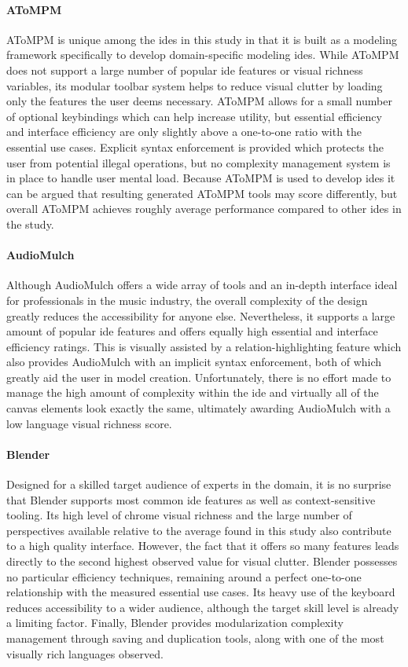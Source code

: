\paragraph{AToMPM} AToMPM is unique among the \acp{ide} in this study in
that it is built as a modeling framework specifically to develop domain-specific modeling \acp{ide}.
While AToMPM does not support a large number of popular \ac{ide} features
or visual richness variables, its modular toolbar system helps to reduce
visual clutter by loading only the features the user deems necessary.
AToMPM allows for a small number of optional keybindings which can help
increase utility, but essential efficiency and interface efficiency are
only slightly above a one-to-one ratio with the essential use cases.
Explicit syntax enforcement is provided which protects the user from
potential illegal operations, but no complexity management system is in
place to handle user mental load. Because AToMPM is used to develop
\acp{ide} it can be argued that resulting generated AToMPM tools may score
differently, but overall AToMPM achieves roughly average performance
compared to other \acp{ide} in the study.

\paragraph{AudioMulch} Although AudioMulch offers a wide array of tools and
an in-depth interface ideal for professionals in the music industry, the
overall complexity of the design greatly reduces the accessibility for
anyone else. Nevertheless, it supports a large amount of popular \ac{ide}
features and offers equally high essential and interface efficiency
ratings. This is visually assisted by a relation-highlighting feature which
also provides AudioMulch with an implicit syntax enforcement, both of which
greatly aid the user in model creation. Unfortunately, there is no effort
made to manage the high amount of complexity within the \ac{ide} and
virtually all of the canvas elements look exactly the same, ultimately
awarding AudioMulch with a low language visual richness score.

\paragraph{Blender} Designed for a skilled target audience of experts in
the domain, it is no surprise that Blender supports most common \ac{ide}
features as well as context-sensitive tooling. Its high level of chrome
visual richness and the large number of perspectives available relative to
the average found in this study also contribute to a high quality
interface. However, the fact that it offers so many features leads directly to the second highest
observed value for visual clutter. Blender possesses no particular efficiency
techniques, remaining around a perfect one-to-one relationship with the
measured essential use cases. Its heavy use of the keyboard reduces
accessibility to a wider audience, although the target skill level is
already a limiting factor. Finally, Blender provides modularization
complexity management through saving and duplication tools, along with one
of the most visually rich languages observed.

